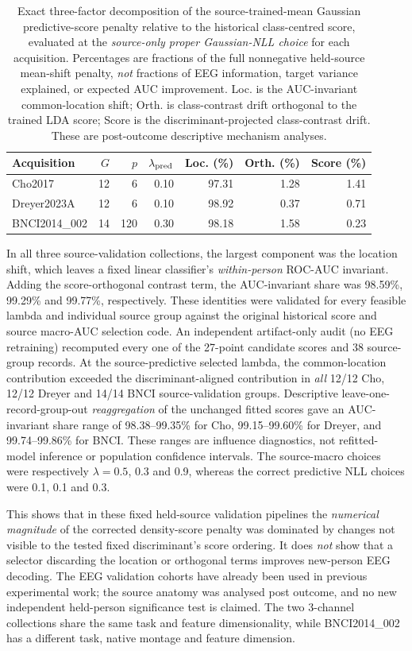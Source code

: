\begin{table}[ht]
\centering
\scriptsize
\caption{Exact three-factor decomposition of the
source-trained-mean Gaussian predictive-score penalty
relative to the historical class-centred score,
evaluated at the \emph{source-only proper Gaussian-NLL
choice} for each acquisition. Percentages are fractions
of the full nonnegative held-source mean-shift penalty,
\emph{not} fractions of EEG information, target
variance explained, or expected AUC improvement.
Loc. is the AUC-invariant common-location shift;
Orth. is class-contrast drift orthogonal to the
trained LDA score; Score is the discriminant-projected
class-contrast drift. These are post-outcome
descriptive mechanism analyses.}
\label{tab:bspc-source-threefactor}
\setlength{\tabcolsep}{3.1pt}
\begin{tabular}{lrrrrrr}
\toprule
Acquisition & $G$ & $p$ & $\lambda_{\rm pred}$
            & Loc. (\%) & Orth. (\%) & Score (\%)\\
\midrule
Cho2017 & 12 & 6 & 0.10 & 97.31 & 1.28 & 1.41\\
Dreyer2023A & 12 & 6 & 0.10 & 98.92 & 0.37 & 0.71\\
BNCI2014\_002 & 14 & 120 & 0.30 & 98.18 & 1.58 & 0.23\\
\bottomrule
\end{tabular}
\end{table}
In all three source-validation collections,
the largest component was the location shift,
which leaves a fixed linear classifier's
\emph{within-person} ROC-AUC invariant.
Adding the score-orthogonal contrast term,
the AUC-invariant share was 98.59\%,
99.29\% and 99.77\%, respectively.
These identities were validated for every
feasible lambda and individual source group
against the original historical score and source
macro-AUC selection code. An independent
artifact-only audit (no EEG retraining) recomputed
every one of the 27-point candidate scores and
38 source-group records. At the source-predictive
selected lambda, the common-location contribution
exceeded the discriminant-aligned contribution
in \emph{all} 12/12 Cho, 12/12 Dreyer and 14/14
BNCI source-validation groups. Descriptive
leave-one-record-group-out \emph{reaggregation}
of the unchanged fitted scores gave an
AUC-invariant share range of
98.38--99.35\% for Cho,
99.15--99.60\% for Dreyer, and
99.74--99.86\% for BNCI.
These ranges are influence diagnostics, not
refitted-model inference or population confidence
intervals. The source-macro
choices were respectively $\lambda=0.5$,
0.3 and 0.9, whereas the correct predictive
NLL choices were 0.1, 0.1 and 0.3.

This shows that in these fixed held-source
validation pipelines the \emph{numerical magnitude}
of the corrected density-score penalty was
dominated by changes not visible to the
tested fixed discriminant's score ordering.
It does \emph{not} show that a selector
discarding the location or orthogonal terms
improves new-person EEG decoding.
The EEG validation cohorts have already
been used in previous experimental work;
the source anatomy was analysed post outcome,
and no new independent held-person significance
test is claimed. The two 3-channel collections
share the same task and feature dimensionality,
while BNCI2014\_002 has a different task,
native montage and feature dimension.
